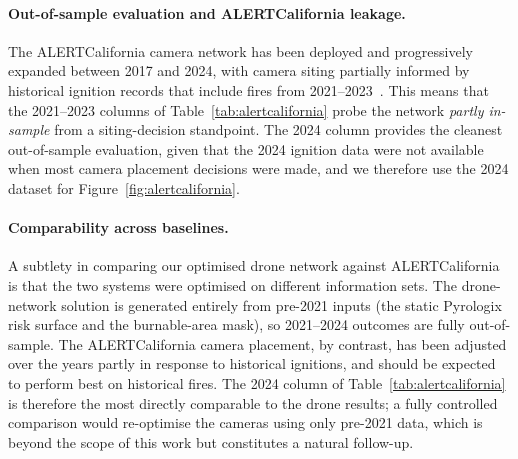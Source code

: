 \paragraph{Out-of-sample evaluation and ALERTCalifornia leakage.}
The ALERTCalifornia camera network has been deployed and progressively expanded
between 2017 and 2024, with camera siting partially informed by historical
ignition records that include fires from 2021--2023~\cite{alertcalifornia_history,alertcalifornia2026}.
This means that the 2021--2023 columns of Table~\ref{tab:alertcalifornia} probe
the network \emph{partly in-sample} from a siting-decision standpoint. The 2024
column provides the cleanest out-of-sample evaluation, given that the 2024
ignition data were not available when most camera placement decisions were made,
and we therefore use the 2024 dataset for Figure~\ref{fig:alertcalifornia}.

\paragraph{Comparability across baselines.}
A subtlety in comparing our optimised drone network against ALERTCalifornia is
that the two systems were optimised on different information sets. The
drone-network solution is generated entirely from pre-2021 inputs (the static
Pyrologix risk surface and the burnable-area mask), so 2021--2024 outcomes are
fully out-of-sample. The ALERTCalifornia camera placement, by contrast, has been
adjusted over the years partly in response to historical ignitions, and should be
expected to perform best on historical fires. The 2024 column of
Table~\ref{tab:alertcalifornia} is therefore the most directly comparable to the
drone results; a fully controlled comparison would re-optimise the cameras using
only pre-2021 data, which is beyond the scope of this work but constitutes a
natural follow-up.

